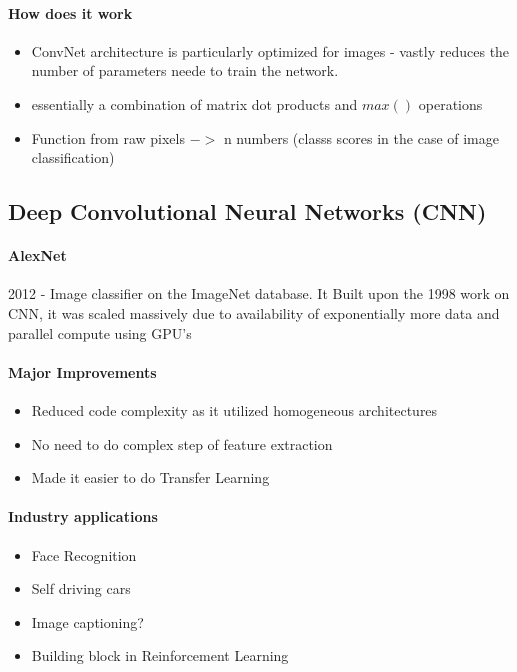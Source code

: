 \documentclass{article}
\begin{document}
		\paragraph{How does it work}
		\begin{itemize}
			\item ConvNet architecture is particularly optimized for images - vastly reduces the number of parameters neede to train the network.
			\item essentially a combination of matrix dot products and $max()$ operations 
			\item Function from raw pixels $->$ n numbers (classs scores in the case of image classification) 
			
		\end{itemize}
			
	\subsection{Deep Convolutional Neural Networks (CNN)}
		\paragraph{AlexNet}
		2012 - Image classifier on the ImageNet database. It Built upon the 1998 work on CNN, it was scaled massively due to availability of exponentially more data and parallel compute using GPU's
		\paragraph{Major Improvements}
		\begin{itemize}
			\item Reduced code complexity as it utilized homogeneous architectures
			\item No need to do complex step of feature extraction
			\item Made it easier to do Transfer Learning
		\end{itemize}
		\paragraph{Industry applications}
		\begin{itemize}
			\item Face Recognition
			\item Self driving cars
			\item Image captioning?
			\item Building block in Reinforcement Learning
		\end{itemize} 
	
\end{document}
